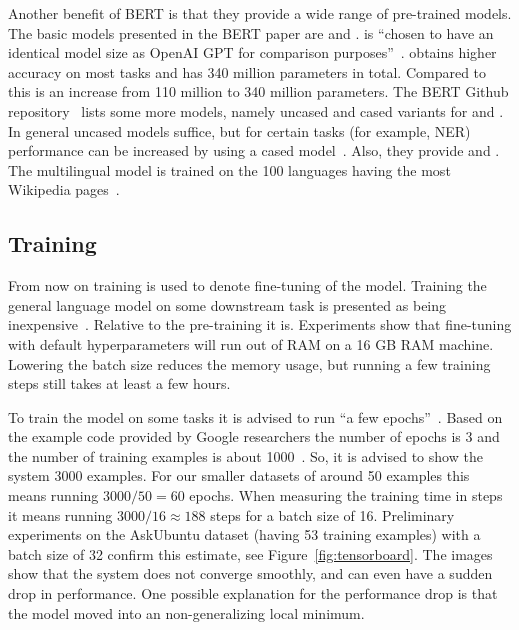 Another benefit of BERT is that they provide a wide range of pre-trained models.
The basic models presented in the BERT paper are  and .
 is ``chosen to have an identical model size as OpenAI GPT for comparison purposes''~\citep{devlin2018}.
 obtains higher accuracy on most tasks and has 340 million parameters in total.
Compared to  this is an increase from 110 million to 340 million parameters.
The BERT Github repository~\citep{devlin2018github} lists some more models, namely uncased and cased variants for  and .
In general uncased models suffice, but for certain tasks (for example, NER) performance can be increased by using a cased model~\citep{devlin2018github}.
Also, they provide  and .
The multilingual model is trained on the 100 languages having the most Wikipedia pages~\citep{devlin2019multi}.

\subsection{Training}
\label{subsec:training}
From now on training is used to denote fine-tuning of the model.
Training the general language model on some downstream task is presented as being inexpensive~\citep{devlin2018github}.
Relative to the pre-training it is.
Experiments show that fine-tuning with default hyperparameters will run out of RAM on a 16 GB RAM machine.
Lowering the batch size reduces the memory usage, but running a few training steps still takes at least a few hours.

To train the model on some tasks it is advised to run ``a few epochs''~\citep{devlin2018github}.
Based on the example code provided by Google researchers the number of epochs is 3 and the number of training examples is about 1000~\citep{bajaj2018}.
So, it is advised to show the system $3000$ examples.
For our smaller datasets of around 50 examples this means running $3000 / 50 = 60$ epochs.
When measuring the training time in steps it means running $3000 / 16 \approx 188$ steps for a batch size of 16.
Preliminary experiments on the AskUbuntu dataset (having 53 training examples) with a batch size of 32 confirm this estimate, see Figure~\ref{fig:tensorboard}.
The images show that the system does not converge smoothly, and can even have a sudden drop in performance.
One possible explanation for the performance drop is that the model moved into an non-generalizing local minimum.


